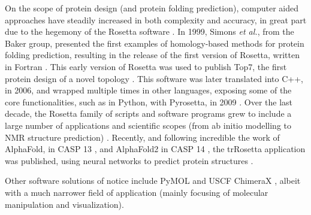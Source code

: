 \documentclass{juliacon}
\begin{document}
On the scope of protein design (and protein folding prediction), computer aided approaches have steadily increased in both complexity and accuracy, in great part due to the hegemony of the Rosetta software \cite{Pereira2021}. In 1999, Simons \emph{et al.}, from the Baker group, presented the first examples of homology-based methods for protein folding prediction, resulting in the release of the first version of Rosetta, written in Fortran \cite{Simons1999}. This early version of Rosetta was used to publish Top7, the first protein design of a novel topology \cite{Kuhlman2003}. This software was later translated into C++, in 2006, and wrapped multiple times in other languages, exposing some of the core functionalities, such as in Python, with Pyrosetta, in 2009 \cite{Chaudhury2010}. Over the last decade, the Rosetta family of scripts and software programs grew to include a large number of applications and scientific scopes (from ab initio modelling to NMR structure prediction) \cite{Leman2020}. Recently, and following incredible the work of AlphaFold, in CASP 13 \cite{Senior2020}, and AlphaFold2 in CASP 14 \cite{Tunyasuvunakool2021, Jumper2021}, the trRosetta application was published, using neural networks to predict protein structures \cite{Yang2020}.\vspace{5mm}

Other software solutions of notice include PyMOL and USCF ChimeraX \cite{Goddard2018}, albeit with a much narrower field of application (mainly focusing of molecular manipulation and visualization).\vspace{5mm}
\end{document}
